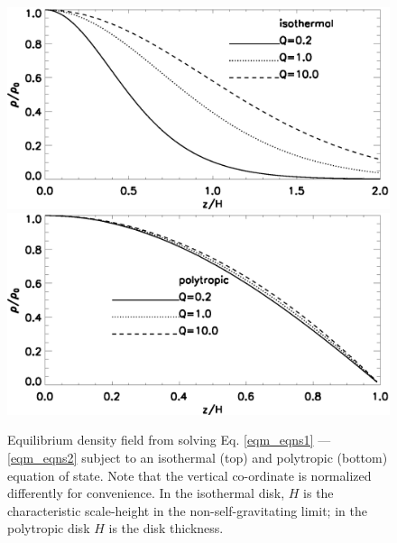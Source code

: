 \begin{figure}
  \includegraphics[width=\linewidth]{figures/compare_iso_density}
  \includegraphics[width=\linewidth]{figures/compare_poly_density}
  \caption{Equilibrium density field from solving Eq. \ref{eqm_eqns1}
    --- \ref{eqm_eqns2} subject to an isothermal (top) and polytropic
    (bottom) equation of state. Note that the vertical co-ordinate is
    normalized differently for convenience. In the isothermal disk,
    $H$ is the characteristic scale-height in the
    non-self-gravitating limit; in the polytropic disk $H$ is the
    disk thickness. \label{eqm_den}}
\end{figure}

